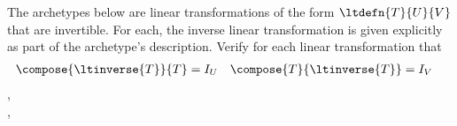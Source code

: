 The archetypes below are linear transformations of the form $\ltdefn{T}{U}{V}$ that are invertible.  For each, the inverse linear transformation is given explicitly as part of the archetype's description.  Verify for each linear transformation that 
\begin{align*}
\compose{\ltinverse{T}}{T}&=I_U & \compose{T}{\ltinverse{T}}&=I_V
\end{align*}
%
,\\
,\\

